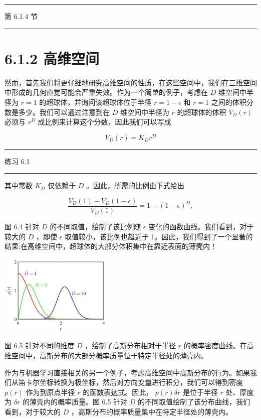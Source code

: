 \documentclass[10pt]{report}
\newcommand{\HRule}{\begin{center}\rule{0.9\linewidth}{0.2mm}\end{center}}
\begin{document}
\HRule

第 6.1.4 节

\HRule

\section*{6.1.2 高维空间}

然而，首先我们将更仔细地研究高维空间的性质，在这些空间中，我们在三维空间中形成的几何直觉可能会严重失效。作为一个简单的例子，考虑在 \(D\) 维空间中半径为 \(r = 1\) 的超球体，并询问该超球体位于半径 \(r = 1 - \epsilon\) 和 \(r = 1\) 之间的体积分数是多少。我们可以通过注意到在 \(D\) 维空间中半径为 \(r\) 的超球体的体积 \({V}_{D}\left( r\right)\) 必须与 \({r}^{D}\) 成比例来计算这个分数，因此我们可以写成

\[
{V}_{D}\left( r\right)  = {K}_{D}{r}^{D} \tag{6.4}
\]

\HRule

练习 6.1

\HRule

其中常数 \({K}_{D}\) 仅依赖于 \(D\) 。因此，所需的比例由下式给出

\[
\frac{{V}_{D}\left( 1\right)  - {V}_{D}\left( {1 - \epsilon }\right) }{{V}_{D}\left( 1\right) } = 1 - {\left( 1 - \epsilon \right) }^{D}, \tag{6.5}
\]

图 6.4 针对 \(D\) 的不同取值，绘制了该比例随 \(\epsilon\) 变化的函数曲线。我们看到，对于较大的 \(D\) ，即使 \(\epsilon\) 取值较小，该比例也趋近于 1。因此，我们得到了一个显著的结果:在高维空间中，超球体的大部分体积集中在靠近表面的薄壳内！

\begin{center}
\includegraphics[max width=0.4\textwidth]{images/0194e279-9b28-703a-88f4-c3ac21e2010d_195_938_347_613_444_0.jpg}
\end{center}
\hspace*{3em} 

图 6.5 针对不同的维度 \(D\) ，绘制了高斯分布相对于半径 \(r\) 的概率密度曲线。在高维空间中，高斯分布的大部分概率质量位于特定半径处的薄壳内。

作为与机器学习直接相关的另一个例子，考虑高维空间中高斯分布的行为。如果我们从笛卡尔坐标转换为极坐标，然后对方向变量进行积分，我们可以得到密度 \(p\left( r\right)\) 作为到原点半径 \(r\) 的函数表达式。因此， \(p\left( r\right) {\delta r}\) 是位于半径 \(r\) 处、厚度为 \({\delta r}\) 的薄壳内的概率质量。图 6.5 针对 \(D\) 的不同取值绘制了该分布曲线，我们看到，对于较大的 \(D\) ，高斯分布的概率质量集中在特定半径处的薄壳内。
\end{document}

